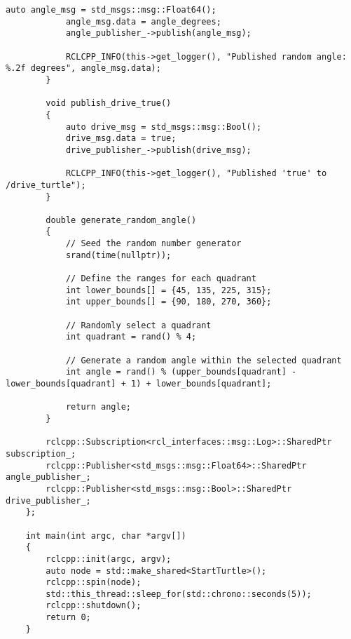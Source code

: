 \begin{lstlisting}[caption={\texttt{/start\_turtle} source code}, label={lst:start_turtle_source_code}]
            auto angle_msg = std_msgs::msg::Float64();
            angle_msg.data = angle_degrees;
            angle_publisher_->publish(angle_msg);
    
            RCLCPP_INFO(this->get_logger(), "Published random angle: %.2f degrees", angle_msg.data);
        }
    
        void publish_drive_true()
        {
            auto drive_msg = std_msgs::msg::Bool();
            drive_msg.data = true;
            drive_publisher_->publish(drive_msg);
    
            RCLCPP_INFO(this->get_logger(), "Published 'true' to /drive_turtle");
        }
    
        double generate_random_angle()
        {
            // Seed the random number generator
            srand(time(nullptr));
    
            // Define the ranges for each quadrant
            int lower_bounds[] = {45, 135, 225, 315};
            int upper_bounds[] = {90, 180, 270, 360};
    
            // Randomly select a quadrant
            int quadrant = rand() % 4;
    
            // Generate a random angle within the selected quadrant
            int angle = rand() % (upper_bounds[quadrant] - lower_bounds[quadrant] + 1) + lower_bounds[quadrant];
    
            return angle;
        }
    
        rclcpp::Subscription<rcl_interfaces::msg::Log>::SharedPtr subscription_;
        rclcpp::Publisher<std_msgs::msg::Float64>::SharedPtr angle_publisher_;
        rclcpp::Publisher<std_msgs::msg::Bool>::SharedPtr drive_publisher_;
    };
    
    int main(int argc, char *argv[])
    {
        rclcpp::init(argc, argv);
        auto node = std::make_shared<StartTurtle>();
        rclcpp::spin(node);
        std::this_thread::sleep_for(std::chrono::seconds(5));
        rclcpp::shutdown();
        return 0;
    }
    
\end{lstlisting}


